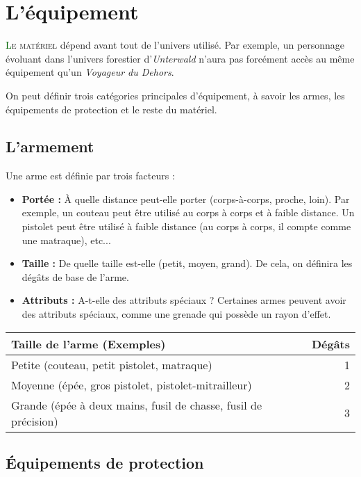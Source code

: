 \newpage

\section{L'équipement}

\lettrine[lines=3]{\initfamily\textcolor{darkgreen}{L}}{e matériel} dépend avant tout de l'univers utilisé. Par exemple, un personnage évoluant dans l'univers forestier d'\emph{Unterwald} n'aura pas forcément accès au même équipement qu'un \emph{Voyageur du Dehors}.

On peut définir trois catégories principales d'équipement, à savoir les armes, les équipements de protection et le reste du matériel.

\subsection{L'armement}

Une arme est définie par trois facteurs :

\begin{itemize}
\item \textbf{Portée :} À quelle distance peut-elle porter (corps-à-corps, proche, loin). Par exemple, un couteau peut être utilisé au corps à corps et à faible distance. Un pistolet peut être utilisé à faible distance (au corps à corps, il compte comme une matraque), etc...
\item \textbf{Taille :} De quelle taille est-elle (petit, moyen, grand). De cela, on définira les dégâts de base de l'arme.
\item \textbf{Attributs :} A-t-elle des attributs spéciaux ? Certaines armes peuvent avoir des attributs spéciaux, comme une grenade qui possède un rayon d'effet.
\end{itemize}

\begin{tabular}{lr}\\\toprule  
Taille de l'arme (Exemples) & Dégâts \\\midrule
Petite (couteau, petit pistolet, matraque) & 1 \\  
Moyenne (épée, gros pistolet, pistolet-mitrailleur) & 2 \\ 
Grande (épée à deux mains, fusil de chasse, fusil de précision) & 3 \\  \bottomrule
\end{tabular}

\subsection{Équipements de protection}

